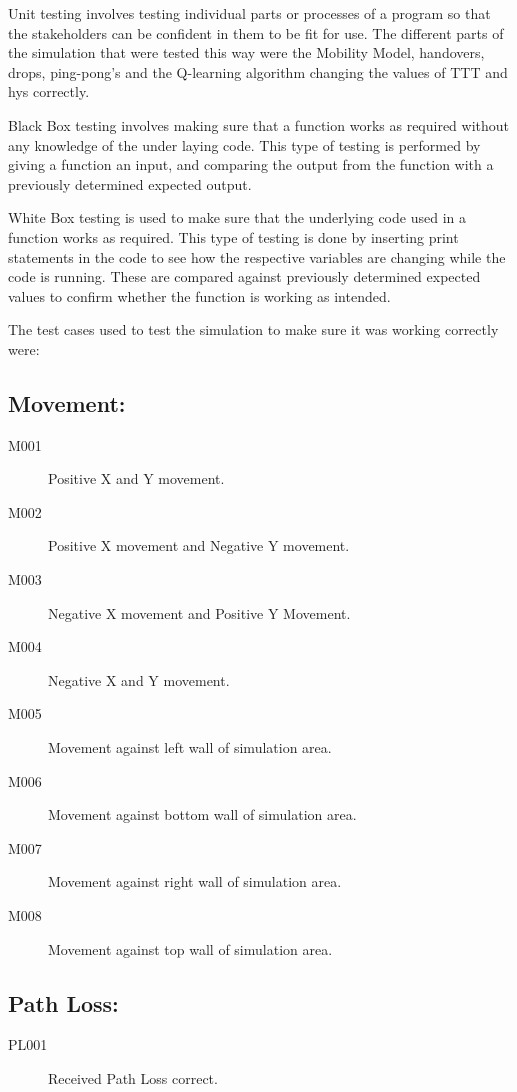 Unit testing involves testing individual parts or processes of a program so that the stakeholders can be confident in them to be fit for use. The different parts of the simulation that were tested this way were the Mobility Model, handovers, drops, ping-pong's and the Q-learning algorithm changing the values of TTT and hys correctly.

Black Box testing involves making sure that a function works as required without any knowledge of the under laying code. This type of testing is performed by giving a function an input, and comparing the output from the function with a previously determined expected output.

White Box testing is used to make sure that the underlying code used in a function works as required. This type of testing is done by inserting print statements in the code to see how the respective variables are changing while the code is running. These are compared against previously determined expected values to confirm whether the function is working as intended.

The test cases used to test the simulation to make sure it was working correctly were: 
\subsection*{Movement:}
\begin{description}
\item[M001]	Positive X and Y movement.
\item[M002]	Positive X movement and Negative Y movement.
\item[M003]	Negative X movement and Positive Y Movement.
\item[M004]	Negative X and Y movement.
\item[M005]	Movement against left wall of simulation area.
\item[M006]	Movement against bottom wall of simulation area.
\item[M007]	Movement against right wall of simulation area.
\item[M008]	Movement against top wall of simulation area.
\end{description}
\subsection*{Path Loss:}
\begin{description}
\item[PL001]	Received Path Loss correct.
\end{description}
